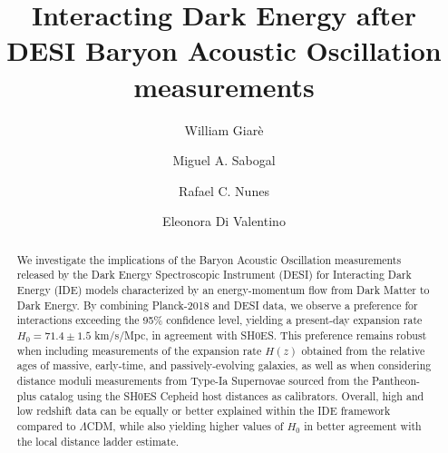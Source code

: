 \documentclass[superscriptaddress,twocolumn,showpacs,a4paper,
amssymb,amsmath,nobibnotes,aps,prl,
showkeys,
nofootinbib,notitlepage]{revtex4-1}
\begin{document}
\title{Interacting Dark Energy after DESI Baryon Acoustic Oscillation measurements}

\author{William Giar\`e}

\author{Miguel A. Sabogal}

\author{Rafael C. Nunes}

\author{Eleonora Di Valentino}

\begin{abstract}
\noindent
We investigate the implications of the Baryon Acoustic Oscillation measurements released by the Dark Energy Spectroscopic Instrument (DESI) for Interacting Dark Energy (IDE) models characterized by an energy-momentum flow from Dark Matter to Dark Energy. By combining Planck-2018 and DESI data, we observe a preference for interactions exceeding the 95\% confidence level, yielding a present-day expansion rate $H_0=71.4\pm1.5$ km/s/Mpc, in agreement with SH0ES.  This preference remains robust when including measurements of the expansion rate $H(z)$ obtained from the relative ages of massive, early-time, and passively-evolving galaxies, as well as when considering distance moduli measurements from Type-Ia Supernovae sourced from the Pantheon-plus catalog using the SH0ES Cepheid host distances as calibrators. Overall, high and low redshift data can be equally or better explained within the IDE framework compared to $\Lambda$CDM, while also yielding higher values of $H_0$ in better agreement with the local distance ladder estimate.
\end{abstract}

\keywords{}

\maketitle
\end{document}
